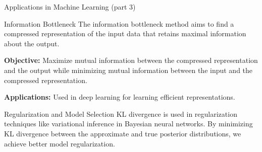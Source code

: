 \documentclass[aspectratio=169]{beamer}
\begin{document}
\begin{frame}{Applications in Machine Learning (part 3)}
    \begin{block}{Information Bottleneck}
        The information bottleneck method aims to find a compressed representation of the input data that retains maximal information about the output.

        \textbf{Objective:} Maximize mutual information between the compressed representation and the output while minimizing mutual information between the input and the compressed representation.

        \textbf{Applications:} Used in deep learning for learning efficient representations.
    \end{block}

    \begin{block}{Regularization and Model Selection}
        KL divergence is used in regularization techniques like variational inference in Bayesian neural networks. By minimizing KL divergence between the approximate and true posterior distributions, we achieve better model regularization.
    \end{block}
\end{frame}
\end{document}
